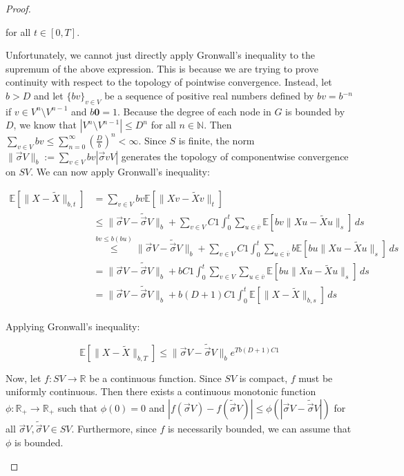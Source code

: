 \documentclass[12pt]{article}
\newcommand{\mb}{\mathbb}
\newcommand{\ra}{\rightarrow}
\newcommand{\ov}{\overline}
\newcommand{\os}{\overset}
\newcommand{\ind}{\hspace{24pt}}
\newcommand{\ex}[1]{\mb{E}\left[#1\right]}			%
\renewcommand{\root}{\mathbf{0}}				%
\renewcommand{\v}{v}							%
\newcommand{\vv}{u}								%
\renewcommand{\S}{S}							%
\newcommand{\s}{\sigma}							%
\newcommand{\sv}{\vec{\s}}						%
\renewcommand{\b}{b}							%
\newcommand{\T}{T}								%
\renewcommand{\t}{t}							%
\renewcommand{\tt}{s}							%
\newcommand{\X}{X}								%
\newcommand{\cl}{\ov}							%
\newcommand{\const}{C}							%
\newcommand{\degr}{D}							%
\newcommand{\sln}[1]{^{#1}}						%
\newcommand{\alt}[1]{\widetilde{#1}}			%
\begin{document}
\begin{proof}
\begin{enumerate}[(a)]
for all \(\t \in [0,\T]\).

\ind Unfortunately, we cannot just directly apply Gronwall's inequality to the supremum of the above expression. This is because we are trying to prove continuity with respect to the topology of pointwise convergence. Instead, let \(\b{} > \degr\) and let \(\{\b{\v}\}_{\v \in V}\) be a sequence of positive real numbers defined by \(\b{\v} = \b{}^{-n}\) if \(\v \in V\sln{n}\setminus V\sln{n-1}\) and \(\b{\root} = 1\). Because the degree of each node in \(G\) is bounded by \(\degr\), we know that \(|V\sln{n}\setminus V\sln{n-1}| \leq \degr^{n}\) for all \(n\in \mb{N}\). Then \(\sum_{\v \in V} \b{\v} \leq \sum_{n=0}^\infty \left(\frac{\degr}{\b{}}\right)^{n} < \infty\). Since \(\S\) is finite, the norm \(\|\sv{}{V}\|_{\b{}} := \sum_{\v \in V} \b{\v}|\sv{\v}{V}|\) generates the topology of componentwise convergence on \(\S{V}\). We can now apply Gronwall's inequality:

\begin{align*}
\ex{\|\X{}{} - \alt{\X}{}{}\|_{\b{},\t}} &= \sum_{\v \in V} \b{\v}\ex{\|\X{\v}{} - \alt{\X}{\v}{}\|_\t}\\
&\leq \|\sv{}{V} - \alt{\sv}{}{V}\|_{\b{}} + \sum_{\v \in V}\const{1}\int_0^\t \sum_{\vv \in \cl{\v}} \ex{\b{\v}\|\X{\vv}{} - \alt{\X}{\vv}{}\|_\tt}\,d\tt\\
&\os{\b{\v}\leq \b{}(\b{\vv})}{\leq} \|\sv{}{V} - \alt{\sv}{}{V}\|_{\b{}} + \sum_{\v \in V}\const{1}\int_0^\t \sum_{\vv \in \cl{\v}} \b{}\ex{\b{\vv}\|\X{\vv}{} - \alt{\X}{\vv}{}\|_\tt}\,d\tt\\
&= \|\sv{}{V} - \alt{\sv}{}{V}\|_{\b{}} + \b{}\const{1}\int_0^\t \sum_{\v \in V}\sum_{\vv \in \cl{\v}} \ex{\b{\vv}\|\X{\vv}{} - \alt{\X}{\vv}{}\|_\tt}\,d\tt\\
&=\|\sv{}{V} - \alt{\sv}{}{V}\|_{\b{}} + \b{}(\degr+1)\const{1}\int_0^\t \ex{\|\X{}{} - \alt{\X}{}{}\|_{\b{},\tt}}\,d\tt\\
\end{align*}

Applying Gronwall's inequality:

\[\ex{\|\X{}{} - \alt{\X}{}{}\|_{\b{},\T}} \leq \|\sv{}{V} - \alt{\sv}{}{V}\|_{\b{}}e^{\T\b{}(\degr+1)\const{1}}\]

Now, let \(f: \S{V} \ra \mb{R}\) be a continuous function. Since \(\S{V}\) is compact, \(f\) must be uniformly continuous. Then there exists a continuous monotonic function \(\phi: \mb{R}_+ \ra \mb{R}_+\) such that \(\phi(0) = 0\) and \(|f(\sv{}{V}) - f(\alt{\sv}{}{V})| \leq \phi(|\sv{}{V} - \alt{\sv}{}{V}|)\) for all \(\sv{}{V},\alt{\sv}{}{V}\in \S{V}\). Furthermore, since \(f\) is necessarily bounded, we can assume that \(\phi\) is bounded.


\end{enumerate}
\end{proof}
\end{document}
